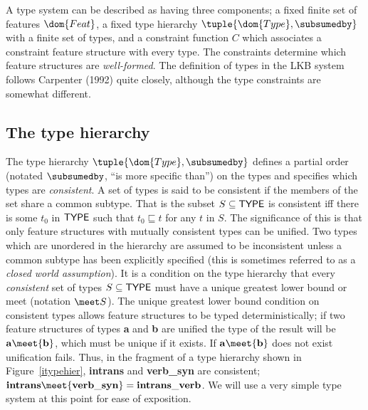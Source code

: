 \documentclass[12pt]{report}
\begin{document}
A type system
can be described as having three components; a fixed finite set of features
$\dom{Feat}$, a fixed type hierarchy $\tuple{\dom{Type}, \subsumedby}$
with a finite set of
types, and a constraint function $C$ which associates a constraint
feature 
structure with
every type.
The constraints determine which feature structures are {\em well-formed}.
The definition of types in the LKB system follows Carpenter (1992)
quite closely, although the type constraints are somewhat different.

\subsection{The type hierarchy}
\label{formthier}

The type hierarchy $\tuple{\dom{Type}, \subsumedby}$
defines a partial order (notated $\subsumedby$,
``is more specific than'')
on the types and specifies
which types are {\em consistent}.
A set of types is said to be consistent if the members of the 
set share a common subtype.
That is the subset $S\subseteq {\sf TYPE}$ is
consistent
iff there is some $t_{0}$ in  ${\sf TYPE}$ such that 
$t_{0} \sqsubseteq t $ for any $t$ in $S$.
The significance of this is that only feature structures with
mutually consistent types can be unified.  Two types which are
unordered in the hierarchy are assumed to be inconsistent
unless a common subtype has been explicitly specified (this is sometimes
referred to as a {\em closed world assumption}).
It is a condition on the type hierarchy that
every {\em consistent} set of types  $S\subseteq {\sf TYPE}$
must have a unique greatest lower bound or
meet (notation  $\meet S$). 
The unique greatest lower bound condition on consistent types
allows feature structures
to be typed deterministically; if two feature structures of types
{\bf a}
and {\bf b} are unified the type of the result will be 
${\bf a} \meet {\bf b} $,
which must
be unique if it exists.  If ${\bf a} \meet {\bf b}$ 
does not exist unification fails.  Thus, in the fragment of a type
hierarchy shown in Figure~\ref{itypehier}, {\bf intrans} and 
{\bf verb\_syn} are
consistent; ${\bf intrans} \meet {\bf verb\_syn} = {\bf
intrans\_verb}$.
We will use a very simple type system at this point for
ease of exposition.
\setlength{\unitlength}{1.2in}
\end{document}
